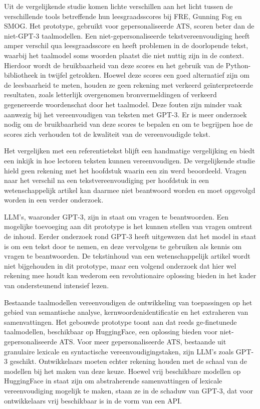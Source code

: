 



Uit de vergelijkende studie komen lichte verschillen aan het licht tussen de verschillende tools betreffende hun leesgraadsscores bij FRE, Gunning Fog en SMOG. Het prototype, gebruikt voor gepersonaliseerde ATS, scoren beter dan de niet-GPT-3 taalmodellen. Een niet-gepersonaliseerde tekstvereenvoudiging heeft amper verschil qua leesgraadsscore en heeft problemen in de doorlopende tekst, waarbij het taalmodel soms woorden plaatst die niet nuttig zijn in de context. Hierdoor wordt de bruikbaarheid van deze scores en het gebruik van de Python-bibliotheek in twijfel getrokken. Hoewel deze scores een goed alternatief zijn om de leesbaarheid te meten, houden ze geen rekening met verkeerd geïnterpreteerde resultaten, zoals letterlijk overgenomen bronvermeldingen of verkeerd gegenereerde woordenschat door het taalmodel. Deze fouten zijn minder vaak aanwezig bij het vereenvoudigen van teksten met GPT-3. Er is meer onderzoek nodig om de bruikbaarheid van deze scores te bepalen en om te begrijpen hoe de scores zich verhouden tot de kwaliteit van de vereenvoudigde tekst. 

\medspace

Het vergelijken met een referentietekst blijft een handmatige vergelijking en biedt een inkijk in hoe lectoren teksten kunnen vereenvoudigen. De vergelijkende studie hield geen rekening met het hoofdstuk waarin een zin werd beoordeeld. Vragen naar het verschil na een tekstvereenvoudiging per hoofdstuk in een wetenschappelijk artikel kan daarmee niet beantwoord worden en moet opgevolgd worden in een verder onderzoek.

\medspace

LLM's, waaronder GPT-3, zijn in staat om vragen te beantwoorden. Een mogelijke toevoeging aan dit prototype is het kunnen stellen van vragen omtrent de inhoud. Eerder onderzoek rond GPT-3 heeft uitgewezen dat het model in staat is om een tekst door te nemen, en deze vervolgens te gebruiken als kennis om vragen te beantwoorden. De tekstinhoud van een wetenschappelijk artikel wordt niet bijgehouden in dit prototype, maar een volgend onderzoek dat hier wel rekening mee houdt kan wederom een revolutionaire oplossing bieden in het kader van ondersteunend intensief lezen. 

\medspace


Bestaande taalmodellen vereenvoudigen de ontwikkeling van toepassingen op het gebied van semantische analyse, kernwoordenidentificatie en het extraheren van samenvattingen. Het gebouwde prototype toont aan dat reeds ge-finetunede taalmodellen, beschikbaar op HuggingFace, een oplossing bieden voor niet-gepersonaliseerde ATS. Voor meer gepersonaliseerde ATS, bestaande uit granulaire lexicale en syntactische vereenvoudigingstaken, zijn LLM's zoals GPT-3 geschikt. Ontwikkelaars moeten echter rekening houden met de schaal van de modellen bij het maken van deze keuze. Hoewel vrij beschikbare modellen op HuggingFace in staat zijn om abstraherende samenvattingen of lexicale vereenvoudiging mogelijk te maken, staan ze in de schaduw van GPT-3, dat voor ontwikkelaars vrij beschikbaar is in de vorm van een API.


